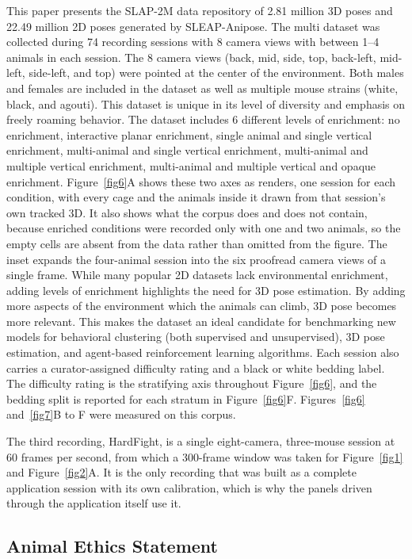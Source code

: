 \documentclass[pdflatex, sn-nature]{sn-jnl}
\theoremstyle{thmstyleone}%
\theoremstyle{thmstyletwo}%
\theoremstyle{thmstylethree}%
\begin{document}
This paper presents the SLAP-2M data repository of 2.81 million 3D poses and 22.49 million 2D poses generated by SLEAP-Anipose. The multi dataset was collected during 74 recording sessions with 8 camera views with between 1--4 animals in each session. The 8 camera views (back, mid, side, top, back-left, mid-left, side-left, and top) were pointed at the center of the environment. Both males and females are included in the dataset as well as multiple mouse strains (white, black, and agouti). This dataset is unique in its level of diversity and emphasis on freely roaming behavior. The dataset includes 6 different levels of enrichment: no enrichment, interactive planar enrichment, single animal and single vertical enrichment, multi-animal and single vertical enrichment, multi-animal and multiple vertical enrichment, multi-animal and multiple vertical and opaque enrichment. Figure~\ref{fig6}A shows these two axes as renders, one session for each condition, with every cage and the animals inside it drawn from that session's own tracked 3D. It also shows what the corpus does and does not contain, because enriched conditions were recorded only with one and two animals, so the empty cells are absent from the data rather than omitted from the figure. The inset expands the four-animal session into the six proofread camera views of a single frame. While many popular 2D datasets lack environmental enrichment, adding levels of enrichment highlights the need for 3D pose estimation. By adding more aspects of the environment which the animals can climb, 3D pose becomes more relevant. This makes the dataset an ideal candidate for benchmarking new models for behavioral clustering (both supervised and unsupervised), 3D pose estimation, and agent-based reinforcement learning algorithms. Each session also carries a curator-assigned difficulty rating and a black or white bedding label. The difficulty rating is the stratifying axis throughout Figure~\ref{fig6}, and the bedding split is reported for each stratum in Figure~\ref{fig6}F. Figures~\ref{fig6} and~\ref{fig7}B to F were measured on this corpus.

The third recording, HardFight, is a single eight-camera, three-mouse session at 60 frames per second, from which a 300-frame window was taken for Figure~\ref{fig1} and Figure~\ref{fig2}A. It is the only recording that was built as a complete application session with its own calibration, which is why the panels driven through the application itself use it.

\subsection{Animal Ethics Statement}\label{methods-mice}
\end{document}
